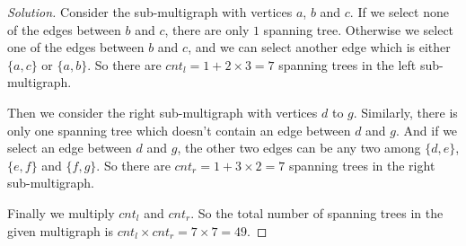 \begin{proof}[Solution]
        Consider the sub-multigraph with vertices $a$, $b$ and $c$. If we select none of the edges between $b$ and $c$, there are only $1$ spanning tree. Otherwise we select one of the edges between $b$ and $c$, and we can select another edge which is either $\{a, c\}$ or $\{a, b\}$. So there are $cnt_l = 1 + 2 \times 3 = 7$ spanning trees in the left sub-multigraph.
        
        Then we consider the right sub-multigraph with vertices $d$ to $g$. Similarly, there is only one spanning tree which doesn't contain an edge between $d$ and $g$. And if we select an edge between $d$ and $g$, the other two edges can be any two among $\{d, e\}$, $\{e, f\}$ and $\{f, g\}$. So there are $cnt_r = 1 + 3 \times 2 = 7$ spanning trees in the right sub-multigraph.
        
        Finally we multiply $cnt_l$ and $cnt_r$. So the total number of spanning trees in the given multigraph is $cnt_l \times cnt_r = 7 \times 7 = 49$.
    \end{proof}




